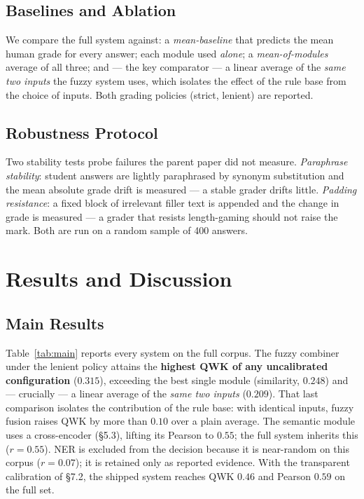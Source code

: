 \documentclass[11pt,a4paper]{article}
\begin{document}
\subsection{Baselines and Ablation}

We compare the full system against: a \emph{mean-baseline} that predicts the mean
human grade for every answer; each module used \emph{alone}; a \emph{mean-of-modules}
average of all three; and --- the key comparator --- a linear average of the
\emph{same two inputs} the fuzzy system uses, which isolates the effect of the rule
base from the choice of inputs. Both grading policies (strict, lenient) are reported.

\subsection{Robustness Protocol}

Two stability tests probe failures the parent paper did not measure.
\emph{Paraphrase stability}: student answers are lightly paraphrased by
synonym substitution and the mean absolute grade drift is measured --- a stable
grader drifts little. \emph{Padding resistance}: a fixed block of irrelevant
filler text is appended and the change in grade is measured --- a grader that
resists length-gaming should not raise the mark. Both are run on a random sample
of 400 answers.

\section{Results and Discussion}

\subsection{Main Results}

Table~\ref{tab:main} reports every system on the full corpus. The fuzzy combiner
under the lenient policy attains the \textbf{highest QWK of any uncalibrated
configuration} ($0.315$), exceeding the best single module (similarity, $0.248$)
and --- crucially --- a linear average of the \emph{same two inputs}
($0.209$). That last comparison isolates the contribution of the rule base: with
identical inputs, fuzzy fusion raises QWK by more than $0.10$ over a plain
average. The semantic module uses a cross-encoder (§5.3), lifting its Pearson to
$0.55$; the full system inherits this ($r=0.55$). NER is excluded from the
decision because it is near-random on this corpus ($r=0.07$); it is retained only
as reported evidence. With the transparent calibration of §7.2, the shipped system
reaches QWK $0.46$ and Pearson $0.59$ on the full set.
\end{document}
